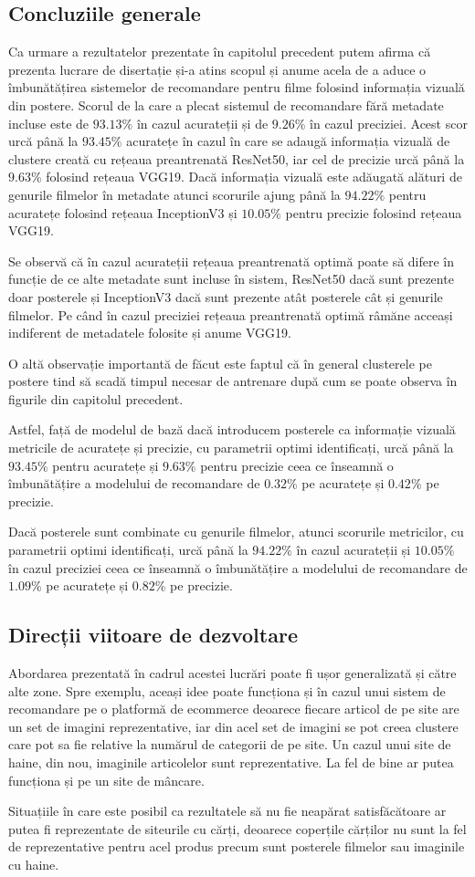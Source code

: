 \subsection*{Concluziile generale}

Ca urmare a rezultatelor prezentate în capitolul precedent putem afirma că prezenta lucrare de disertație și-a atins scopul și anume acela de a aduce o îmbunătățirea sistemelor de recomandare pentru filme folosind informația vizuală din postere. 
Scorul de la care a plecat sistemul de recomandare fără metadate incluse este de $93.13\%$ în cazul acurateții și de $9.26\%$ în cazul preciziei. Acest scor urcă până la $93.45\%$ acuratețe în cazul în care se adaugă informația vizuală de clustere creată cu rețeaua preantrenată ResNet50, iar cel de precizie urcă până la $9.63\%$ folosind rețeaua VGG19. Dacă informația vizuală este adăugată alături de genurile filmelor în metadate atunci scorurile ajung până la $94.22\%$ pentru acuratețe folosind rețeaua InceptionV3 și $10.05\%$ pentru precizie folosind rețeaua VGG19.

Se observă că în cazul acurateții rețeaua preantrenată optimă poate să difere în funcție de ce alte metadate sunt incluse în sistem, ResNet50 dacă sunt prezente doar posterele și InceptionV3 dacă sunt prezente atât posterele cât și genurile filmelor. Pe când în cazul preciziei rețeaua preantrenată optimă râmăne acceași indiferent de metadatele folosite și anume VGG19.

O altă observație importantă de făcut este faptul că în general clusterele pe postere tind să scadă timpul necesar de antrenare după cum se poate observa în figurile din capitolul precedent. 

Astfel, față de modelul de bază dacă introducem posterele ca informație vizuală metricile de acuratețe și precizie, cu parametrii optimi identificați, urcă până la $93.45\%$ pentru acuratețe și $9.63\%$ pentru precizie ceea ce înseamnă o îmbunătățire a modelului de recomandare de $0.32\%$ pe acuratețe și $0.42\%$ pe precizie.

Dacă posterele sunt combinate cu genurile filmelor, atunci scorurile metricilor, cu parametrii optimi identificați, urcă până la $94.22\%$ în cazul acurateții și $10.05\%$ în cazul preciziei ceea ce înseamnă o îmbunătățire a modelului de recomandare de $1.09\%$ pe acuratețe și $0.82\%$ pe precizie. 

\subsection*{Direcții viitoare de dezvoltare}
Abordarea prezentată în cadrul acestei lucrări poate fi ușor generalizată și către alte zone. Spre exemplu, aceași idee poate funcționa și în cazul unui sistem de recomandare pe o platformă de ecommerce deoarece fiecare articol de pe site are un set de imagini reprezentative, iar din acel set de imagini se pot creea clustere care pot sa fie relative la numărul de categorii de pe site. Un cazul unui site de haine, din nou, imaginile articolelor sunt reprezentative. La fel de bine ar putea funcționa și pe un site de mâncare. 

Situațiile în care este posibil ca rezultatele să nu fie neapărat satisfăcătoare ar putea fi reprezentate de siteurile cu cărți, deoarece coperțile cărților nu sunt la fel de reprezentative pentru acel produs precum sunt posterele filmelor sau imaginile cu haine.